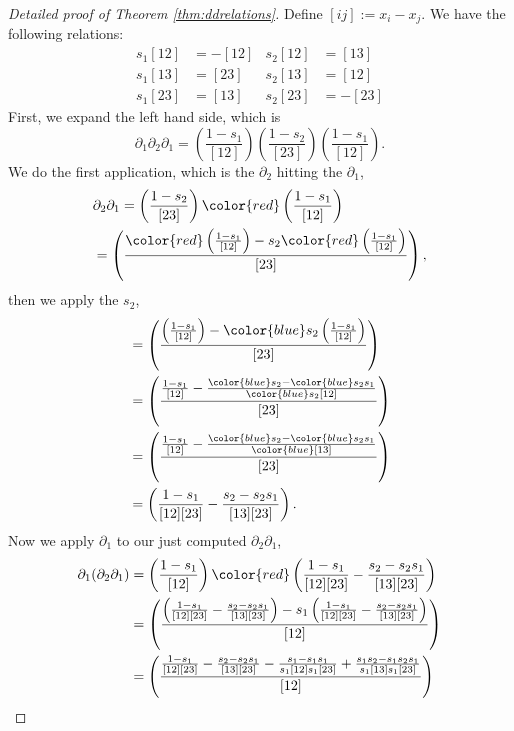 \documentclass{article}
\begin{document}
\begin{proof}[Detailed proof of Theorem \ref{thm:ddrelations}] 
    Define $[ij] := x_i - x_j$.
    We have the following relations:
    \begin{align*}
        s_1[12] &= -[12] & s_2[12] &= [13] \\
        s_1[13] &= [23] & s_2[13] &= [12] \\
        s_1[23] &= [13] & s_2[23] &= -[23]
    \end{align*}
    First, we expand the left hand side, which is
    \[
        \partial_1\partial_2\partial_1 = \left(\frac{1 - s_1}{[12]}\right)\left(\frac{1 - s_2}{[23]}\right)\left(\frac{1 - s_1}{[12]}\right).
    \]
    We do the first application, which is the $\partial_2$ hitting the $\partial_1$,
    \begin{align*}
        &\partial_2\partial_1 = \left(\frac{1 - s_2}{[23]}\right) {\color{red} \left(\frac{1 - s_1}{[12]}\right)} \\
        &= \left(\frac{{\color{red}\left(\frac{1 - s_1}{[12]}\right)} - s_2{\color{red}\left(\frac{1 - s_1}{[12]}\right)}}{[23]}\right),
    \end{align*}
    then we apply the $s_2$,
    \begin{align*}
        &= \left(\frac{\left(\frac{1 - s_1}{[12]}\right) - {\color{blue}s_2}\left(\frac{1 - s_1}{[12]}\right)}{[23]}\right) \\
        &= \left(\frac{\frac{1 - s_1}{[12]} - \frac{{\color{blue}s_2} - {\color{blue}s_2}s_1}{{\color{blue} s_2}[12]}}{[23]}\right) \\
        &= \left(\frac{\frac{1 - s_1}{[12]} - \frac{{\color{blue}s_2} - {\color{blue}s_2}s_1}{\color{blue}[13]}}{[23]}\right) \\
        &= \left(\frac{1 - s_1}{[12][23]} - \frac{s_2 - s_2s_1}{[13][23]}\right).
    \end{align*}
    Now we apply $\partial_1$ to our just computed $\partial_2\partial_1$,
    \begin{align*}
        \partial_1(\partial_2\partial_1)
        &= \left(\frac{1 - s_1}{[12]}\right){\color{red}\left(\frac{1 - s_1}{[12][23]} - \frac{s_2 - s_2s_1}{[13][23]}\right)} \\
        &= \left(\frac{\left(\frac{1 - s_1}{[12][23]} - \frac{s_2 - s_2s_1}{[13][23]}\right) - s_1\left(\frac{1 - s_1}{[12][23]} - \frac{s_2 - s_2s_1}{[13][23]}\right)}{[12]}\right) \\
        &= \left(\frac{\frac{1 - s_1}{[12][23]} - \frac{s_2 - s_2s_1}{[13][23]} - \frac{s_1 - s_1s_1}{s_1[12]s_1[23]} + \frac{s_1s_2 - s_1s_2s_1}{s_1[13]s_1[23]}}{[12]}\right) \\

\end{align*}
\end{proof}
\end{document}
